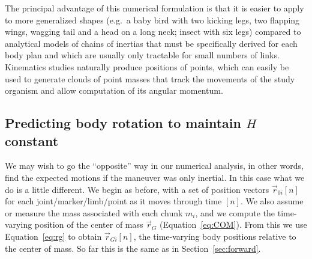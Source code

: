 \documentclass{amsart}
\begin{document}
The principal advantage of this numerical formulation is that it is easier to apply to more generalized shapes (e.g.\ a baby bird with two kicking legs, two flapping wings, wagging tail and a head on a long neck; insect with six legs) compared to analytical models of chains of inertias that must be specifically derived for each body plan \cite{Jusufi:2008, Jusufi:2010, Evangelista:unpub2} and which are usually only tractable for small numbers of links.  Kinematics studies naturally produce positions of points, which can easily be used to generate clouds of point masses that track the movements of the study organism and allow computation of its angular momentum. 






\subsection{Predicting body rotation to maintain $H$ constant}
\label{sec:reverse}
We may wish to go the ``opposite'' way in our numerical analysis, in other words, find the expected motions if the maneuver was only inertial.  In this case what we do is a little different.  We begin as before, with a set of position vectors $\vec{r}_{0i}[n]$ for each joint/marker/limb/point as it moves through time $[n]$. We also assume or measure the mass associated with each chunk $m_i$, and we compute the time-varying position of the center of mass $\vec{r}_G$ (Equation~\ref{eq:COM}). From this we use Equation~\ref{eq:rg} to obtain $\vec{r}_{Gi}[n]$, the time-varying body positions relative to the center of mass. So far this is the same as in Section~\ref{sec:forward}. 
\end{document}
